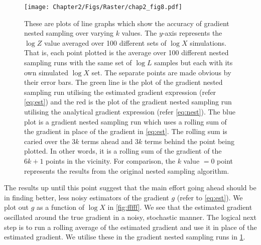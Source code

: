 \begin{figure} 
\centering    
\texttt{[image: Chapter2/Figs/Raster/chap2\_fig8.pdf]}
\caption{ These are plots of line graphs which show the accuracy of gradient nested sampling over varying $k$ values. The $y$-axis represents the $\log Z$ value averaged over 100 different sets of $\log X$ simulations. That is, each point plotted is the average over 100 different nested sampling runs with the same set of $\log L$ samples but each with its own simulated $\log X$ set. The separate points are made obvious by their error bars. The green line is the plot of the gradient nested sampling run utilising the estimated gradient expression (refer \cref{eq:est}) and the red is the plot of the gradient nested sampling run utilising the analytical gradient expression (refer \cref{eq:nest}). The blue plot is a gradient nested sampling run which uses a rolling sum of the gradient in place of the gradient in \cref{eq:est}. The rolling sum is caried over the $3k$ terms ahead and $3k$ terms behind the point being plotted. In other words, it is a rolling sum of the gradient of the $6k+1$ points in the vicinity. For comparison, the $k$ value $=0$ point represents the results from the original nested sampling algorithm.}

\label{fig:rrr}
\end{figure}

The results up until this point suggest that the main effort going ahead should be in finding better, less noisy estimators of the gradient $g$ (refer to \cref{eq:est}). We plot out $g$ as a function of $\log X$ in \cref{fig:fffff}. We see that the estimated gradient oscillated around the true gradient in a noisy, stochastic manner. The logical next step is to run a rolling average of the estimated gradient and use it in place of the estimated gradient. We utilise these in the gradient nested sampling runs in \cref{fig:rrr}.





